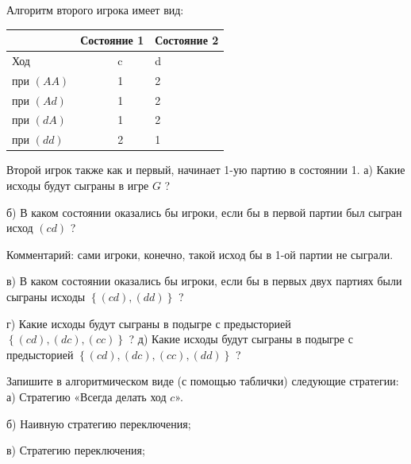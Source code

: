 \begin{problem}
Алгоритм второго игрока имеет вид:


\begin{tabular} {|p{43.12pt}| p{19.60pt}| p{37.52pt}| p{19.60pt}| p{31.92pt}| } \hline
   &  \multicolumn{2}{|l|}{ Состояние 1 } &  \multicolumn{2}{|l|}{ Состояние 2 } \\ \hline
 \multicolumn{2}{|l|}{ Ход } &  \multicolumn{2}{|l|}{ c } &  d  \\ \hline
 \multicolumn{2}{|l|}{ при  $\left(AA\right)$  } &  \multicolumn{2}{|l|}{ 1 } &  2  \\ \hline
 \multicolumn{2}{|l|}{ при  $\left(Ad\right)$  } &  \multicolumn{2}{|l|}{ 1 } &  2  \\ \hline
 \multicolumn{2}{|l|}{ при  $\left(dA\right)$  } &  \multicolumn{2}{|l|}{ 1 } &  2  \\ \hline
 \multicolumn{2}{|l|}{ при  $\left(dd\right)$  } &  \multicolumn{2}{|l|}{ 2 } &  1  \\ \hline
\end{tabular}

Второй игрок также как и первый, начинает 1-ую партию в состоянии 1.
а) Какие исходы будут сыграны в игре  $G$ ?\par
б) В каком состоянии оказались бы игроки, если бы в первой партии был сыгран исход  $\left(cd\right)$ ?\par
Комментарий: сами игроки, конечно, такой исход бы в 1-ой партии не сыграли.\par
в) В каком состоянии оказались бы игроки, если бы в первых двух партиях были сыграны исходы  $\left\{\left(cd\right),\left(dd\right)\right\}$ ?\par
г) Какие исходы будут сыграны в подыгре с предысторией  $\left\{\left(cd\right),\left(dc\right),\left(cc\right)\right\}$ ?
д) Какие исходы будут сыграны в подыгре с предысторией  $\left\{\left(cd\right),\left(dc\right),\left(cc\right),\left(dd\right)\right\}$ ?



\begin{sol}

\end{sol}
\end{problem}



\begin{problem}

Запишите в алгоритмическом виде (с помощью таблички) следующие стратегии:
а) Стратегию «Всегда делать ход  $c$».\par
б) Наивную стратегию переключения;\par
в) Стратегию переключения;



\begin{sol}

\end{sol}
\end{problem}




